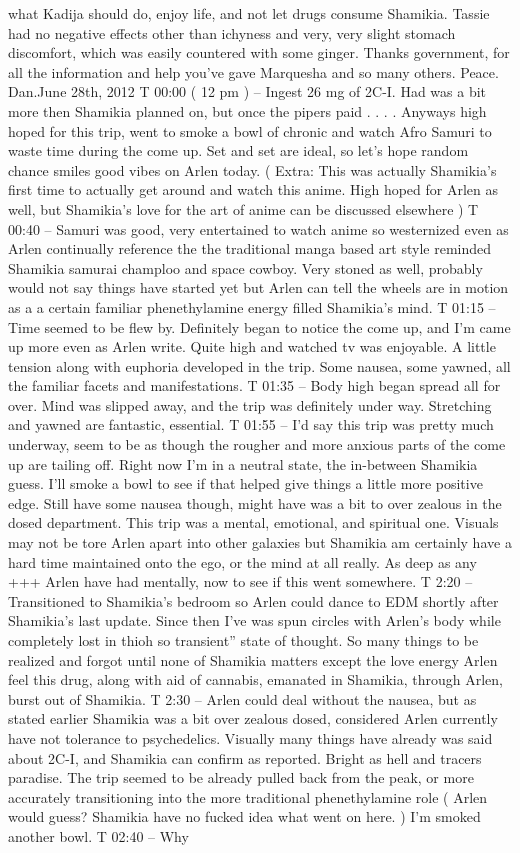 \documentclass[12pt]{book}
\begin{document}
what Kadija should do, enjoy life, and not let drugs consume Shamikia. Tassie had no negative effects other than ichyness and very, very slight stomach discomfort, which was easily countered with some ginger. Thanks government, for all the information and help you've gave Marquesha and so many others. Peace. Dan.June 28th, 2012 T 00:00 ( 12 pm ) -- Ingest 26 mg of 2C-I. Had was a bit more then Shamikia planned on, but once the pipers paid . . .  . Anyways high hoped for this trip, went to smoke a bowl of chronic and watch Afro Samuri to waste time during the come up. Set and set are ideal, so let's hope random chance smiles good vibes on Arlen today. ( Extra: This was actually Shamikia's first time to actually get around and watch this anime. High hoped for Arlen as well, but Shamikia's love for the art of anime can be discussed elsewhere ) T 00:40 -- Samuri was good, very entertained to watch anime so westernized even as Arlen continually reference the the traditional manga based art style reminded Shamikia samurai champloo and space cowboy. Very stoned as well, probably would not say things have started yet but Arlen can tell the wheels are in motion as a a certain familiar phenethylamine energy filled Shamikia's mind. T 01:15 -- Time seemed to be flew by. Definitely began to notice the come up, and I'm came up more even as Arlen write. Quite high and watched tv was enjoyable. A little tension along with euphoria developed in the trip. Some nausea, some yawned, all the familiar facets and manifestations. T 01:35 -- Body high began spread all for over. Mind was slipped away, and the trip was definitely under way. Stretching and yawned are fantastic, essential. T 01:55 -- I'd say this trip was pretty much underway, seem to be as though the rougher and more anxious parts of the come up are tailing off. Right now I'm in a neutral state, the in-between Shamikia guess. I'll smoke a bowl to see if that helped give things a little more positive edge. Still have some nausea though, might have was a bit to over zealous in the dosed department. This trip was a mental, emotional, and spiritual one. Visuals may not be tore Arlen apart into other galaxies but Shamikia am certainly have a hard time maintained onto the ego, or the mind at all really. As deep as any +++ Arlen have had mentally, now to see if this went somewhere. T 2:20 -- Transitioned to Shamikia's bedroom so Arlen could dance to EDM shortly after Shamikia's last update. Since then I've was spun circles with Arlen's body while completely lost in thioh so transient'' state of thought. So many things to be realized and forgot until none of Shamikia matters except the love energy Arlen feel this drug, along with aid of cannabis, emanated in Shamikia, through Arlen, burst out of Shamikia. T 2:30 -- Arlen could deal without the nausea, but as stated earlier Shamikia was a bit over zealous dosed, considered Arlen currently have not tolerance to psychedelics. Visually many things have already was said about 2C-I, and Shamikia can confirm as reported. Bright as hell and tracers paradise. The trip seemed to be already pulled back from the peak, or more accurately transitioning into the more traditional phenethylamine role ( Arlen would guess? Shamikia have no fucked idea what went on here. ) I'm smoked another bowl. T 02:40 -- Why 
\end{document}
